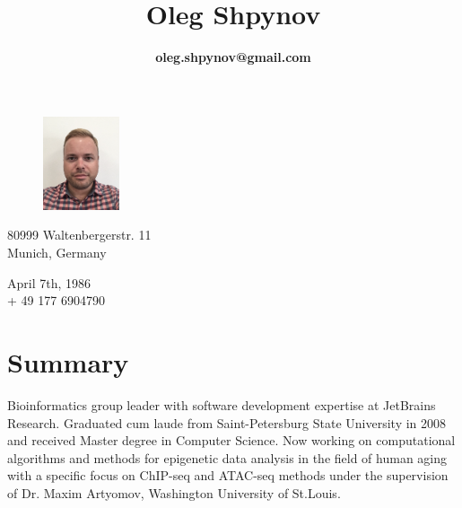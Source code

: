 \documentclass[11pt]{article}
\title{\bfseries\Huge Oleg Shpynov}
\author{\textbf{oleg.shpynov@gmail.com}}
\date{}
\begin{document}
\maketitle 

\begin{figure}
    \vspace*{-4cm} %
	\hfill\includegraphics[width=0.20\textwidth]{me2020.png}
    \vspace*{-4cm} %
\end{figure}



\hspace*{-0.6cm}\begin{minipage}[ht]{0.4\textwidth}
80999 Waltenbergerstr. 11\\
Munich, Germany
\end{minipage}
\begin{minipage}[ht]{0.4\textwidth}
April 7th, 1986\\
+ 49 177 6904790
\end{minipage}
\vspace{10pt}

\section*{Summary}
Bioinformatics group leader with software development expertise at JetBrains Research.
Graduated cum laude from Saint-Petersburg State University in 2008 and received Master degree in Computer Science.
Now working on computational algorithms and methods for epigenetic data analysis in the field of human aging
with a specific focus on ChIP-seq and ATAC-seq methods under the supervision of Dr. Maxim Artyomov, Washington University of St.Louis.

\end{document}
